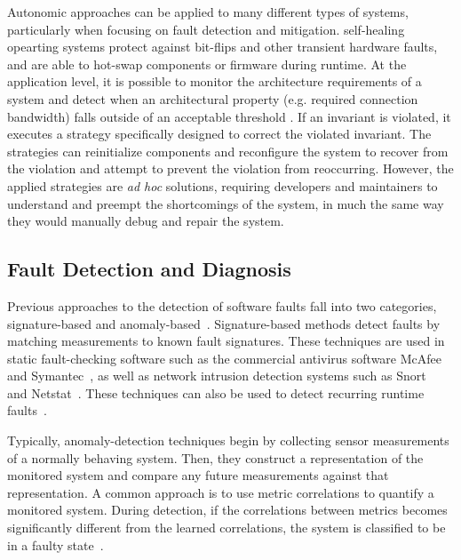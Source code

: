 Autonomic approaches can be applied to many different types of systems, particularly when focusing on fault detection and mitigation. self-healing opearting systems \cite{DBLP:journals/ibmsj/AppavooHSWSKAEGGMORSX03,4351383} protect against bit-flips and other transient hardware faults, and are able to hot-swap components or firmware during runtime. At the application level, it is possible to monitor the architecture requirements of a system and detect when an architectural property (e.g. required connection bandwidth) falls outside of an acceptable threshold \cite{Garlan2004}. If an invariant is violated, it executes a strategy specifically designed to correct the violated invariant. The strategies can reinitialize components and reconfigure the system to recover from the violation and attempt to prevent the violation from reoccurring. However, the applied strategies are \emph{ad hoc} solutions, requiring developers and maintainers to understand and preempt the shortcomings of the system, in much the same way they would manually debug and repair the system.

\subsection{Fault Detection and Diagnosis}
\label{sub:fault_detection}

Previous approaches to the detection of software faults fall into two categories, signature-based and anomaly-based~\cite{al-nashif2008}. Signature-based methods detect faults by matching measurements to known fault signatures. These techniques are used in static fault-checking software such as the commercial antivirus software McAfee~\cite{Mcafee} and Symantec~\cite{symantec}, as well as network intrusion detection systems such as Snort~\cite{Roesch1999}  and Netstat~\cite{Vigna1999}. These techniques can also be used to detect recurring runtime faults~\cite{Brodie2005}.

Typically, anomaly-detection techniques begin by collecting sensor measurements of a normally behaving system. Then, they construct a representation of the monitored system and compare any future measurements against that representation. A common approach is to use metric correlations to quantify a monitored system. During detection, if the correlations between metrics becomes significantly different from the learned correlations, the system is classified to be in a faulty state~\cite{zhen2006,zhao2009,Cohen2004,Jiang2009}.

